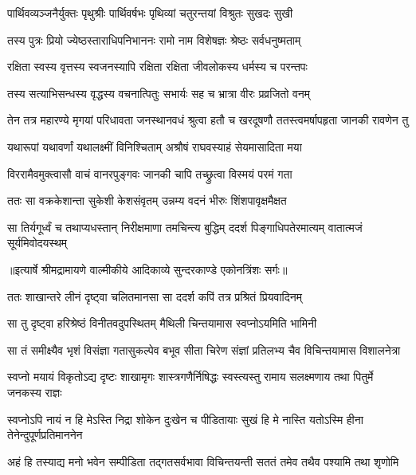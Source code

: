 \twolineshloka
{पार्थिवव्यञ्जनैर्युक्तः पृथुश्रीः पार्थिवर्षभः}
{पृथिव्यां चतुरन्तयां विश्रुतः सुखदः सुखी} %

\twolineshloka
{तस्य पुत्रः प्रियो ज्येष्ठस्ताराधिपनिभाननः}
{रामो नाम विशेषज्ञः श्रेष्ठः सर्वधनुष्मताम्} %

\twolineshloka
{रक्षिता स्वस्य वृत्तस्य स्वजनस्यापि रक्षिता}
{रक्षिता जीवलोकस्य धर्मस्य च परन्तपः} %

\twolineshloka
{तस्य सत्याभिसन्धस्य वृद्धस्य वचनात्पितुः}
{सभार्यः सह च भ्रात्रा वीरः प्रव्रजितो वनम्} %

\threelineshloka
{तेन तत्र महारण्ये मृगयां परिधावता}
{जनस्थानवधं श्रुत्वा हतौ च खरदूषणौ}
{ततस्त्वमर्षापहृता जानकी रावणेन तु} %

\twolineshloka
{यथारूपां यथावर्णां यथालक्ष्मीं विनिश्चिताम्}
{अश्रौषं राघवस्याहं सेयमासादिता मया} %

\twolineshloka
{विररामैवमुक्त्वासौ वाचं वानरपुङ्गवः}
{जानकी चापि तच्छ्रुत्वा विस्मयं परमं गता} %

\twolineshloka
{ततः सा वक्रकेशान्ता सुकेशी केशसंवृतम्}
{उन्नम्य वदनं भीरुः शिंशपावृक्षमैक्षत} %

\fourlineindentedshloka
{सा तिर्यगूर्ध्वं च तथाप्यधस्तान्}
{निरीक्षमाणा तमचिन्त्य बुद्धिम्}
{ददर्श पिङ्गाधिपतेरमात्यम्}
{वातात्मजं सूर्यमिवोदयस्थम्} %


{॥इत्यार्षे श्रीमद्रामायणे वाल्मीकीये आदिकाव्ये सुन्दरकाण्डे एकोनत्रिंशः सर्गः॥}


\twolineshloka
{ततः शाखान्तरे लीनं दृष्ट्वा चलितमानसा}
{सा ददर्श कपिं तत्र प्रश्रितं प्रियवादिनम्} %

\twolineshloka
{सा तु दृष्ट्वा हरिश्रेष्ठं विनीतवदुपस्थितम्}
{मैथिली चिन्तयामास स्वप्नोऽयमिति भामिनी} %

\fourlineindentedshloka
{सा तं समीक्ष्यैव भृशं विसंज्ञा}
{गतासुकल्पेव बभूव सीता}
{चिरेण संज्ञां प्रतिलभ्य चैव}
{विचिन्तयामास विशालनेत्रा} %

\fourlineindentedshloka
{स्वप्नो मयायं विकृतोऽद्य दृष्टः}
{शाखामृगः शास्त्रगणैर्निषिद्धः}
{स्वस्त्यस्तु रामाय सलक्ष्मणाय}
{तथा पितुर्मे जनकस्य राज्ञः} %

\fourlineindentedshloka
{स्वप्नोऽपि नायं न हि मेऽस्ति निद्रा}
{शोकेन दुःखेन च पीडितायाः}
{सुखं हि मे नास्ति यतोऽस्मि हीना}
{तेनेन्दुपूर्णप्रतिमाननेन} %

\fourlineindentedshloka
{अहं हि तस्याद्य मनो भवेन}
{सम्पीडिता तद्गतसर्वभावा}
{विचिन्तयन्ती सततं तमेव}
{तथैव पश्यामि तथा शृणोमि} %

